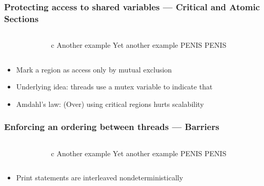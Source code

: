 \documentclass[handout]{beamer}
\begin{document}
\begin{frame}[fragile]
  \frametitle{Protecting access to shared variables --- Critical and Atomic Sections}
  \begin{columns}[t]%
    \begin{column}{0.65\textwidth}
    \end{column}
    \pause
    \begin{column}{0.4\textwidth}
      \begin{ccode}[]
        {c}
        Another example
        Yet another example
        PENIS
        PENIS
      \end{ccode}
    \end{column}
  \end{columns}
  \pause
  \begin{itemize}
  \item Mark a region as access only by mutual exclusion
  \item Underlying idea: threads use a mutex variable to indicate that
  \item Amdahl's law: (Over) using critical regions hurts scalability 
  \end{itemize}
\end{frame}



\begin{frame}[fragile]
  \frametitle{Enforcing an ordering between threads --- Barriers}
  \begin{columns}[t]%
    \begin{column}{0.65\textwidth}
    \end{column}
    \pause
    \begin{column}{0.4\textwidth}
      \begin{ccode}[]
        {c}
        Another example
        Yet another example
        PENIS
        PENIS
      \end{ccode}
    \end{column}
  \end{columns}
  \pause
  \begin{itemize}
  \item Print statements are interleaved nondeterministically
  \end{itemize}
\end{frame}
\end{document}
